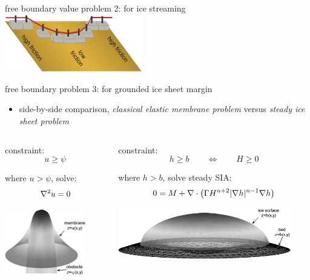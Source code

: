 \begin{frame}{free boundary value problem 2: for ice streaming}
{  \includegraphics[width=0.45\textwidth]{photos/schoof_sliders}
}
\end{frame}


\begin{frame}{free boundary problem 3: for grounded ice sheet margin}

\begin{itemize}
\item side-by-side comparison, \emph{classical elastic membrane problem} versus \emph{steady ice sheet problem}
\end{itemize}
\small
\begin{columns}[T]
\begin{column}{0.4\textwidth}
constraint:
  $$u \ge \psi$$

where $u>\psi$, solve:
  $$\nabla^2 u = 0$$

\bigskip
\includegraphics[width=0.8\textwidth]{photos/classicalobs}
\end{column}
\begin{column}{0.6\textwidth}
constraint:
  $$h \ge b \qquad \iff \qquad H \ge 0$$

where $h>b$, solve steady SIA:
  $$0 = M + \nabla\cdot \left(\Gamma H^{n+2} |\nabla h|^{n-1} \nabla h \right)$$

\bigskip
\includegraphics[width=0.9\textwidth]{photos/capnonflatobs}
\end{column}
\end{columns}
\end{frame}


